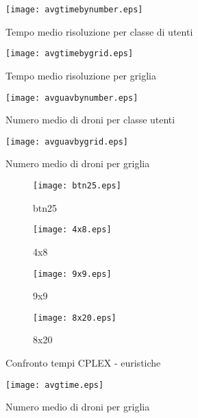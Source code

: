 %
\begin{figure}
	\begin{center}
		\texttt{[image: avgtimebynumber.eps]}
	\end{center}
	\caption{Tempo medio risoluzione per classe di utenti} \label{fig:avgtimebynumber}
\end{figure}
%
%
\begin{figure}
	\begin{center}
		\texttt{[image: avgtimebygrid.eps]}
	\end{center}
	\caption{Tempo medio risoluzione per griglia} \label{fig:avgtimebygrid}
\end{figure}
%
%
\begin{figure}
	\begin{center}
		\texttt{[image: avguavbynumber.eps]}
	\end{center}
	\caption{Numero medio di droni per classe utenti} \label{fig:avguavbynumber}
\end{figure}
%
%
\begin{figure}
	\begin{center}
		\texttt{[image: avguavbygrid.eps]}
	\end{center}
	\caption{Numero medio di droni per griglia} \label{fig:avguavbygrid}
\end{figure}
%
%
\begin{figure}
	\centering
	\begin{subfigure}[b]{0.4\textwidth}
		\centering
		\texttt{[image: btn25.eps]}
		\caption{btn25}
		\label{fig:btn25}
	\end{subfigure}
	\begin{subfigure}[b]{0.4\textwidth}
		\centering
		\texttt{[image: 4x8.eps]}
		\caption{4x8}
		\label{fig:4x8}
	\end{subfigure}
	\begin{subfigure}[b]{0.4\textwidth}
		\centering
		\texttt{[image: 9x9.eps]}
		\caption{9x9}
		\label{fig:9x9}
	\end{subfigure}
	\begin{subfigure}[b]{0.4\textwidth}
		\centering
		\texttt{[image: 8x20.eps]}
		\caption{8x20}
		\label{fig:8x20}
	\end{subfigure}
	\caption{Confronto tempi CPLEX - euristiche}
	\label{fig:mix}
\end{figure}
%
\clearpage
%
\begin{figure}
	\begin{center}
		\texttt{[image: avgtime.eps]}
	\end{center}
	\caption{Numero medio di droni per griglia} \label{fig:avgtime}
\end{figure}
